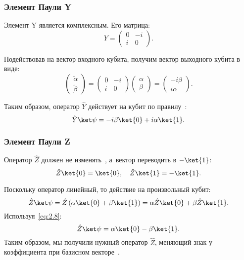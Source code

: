 \documentclass[pscyr,notitlepage]{hedwork}
\newcommand{\eq}[1]{\eqref{eq:#1}}
\renewcommand{\~}[1]{\widetilde{#1}}
\newcommand{\lb}{\left(}
\newcommand{\rb}{\right)}
\begin{document}
  \subsubsection{Элемент Паули Y}

  Элемент Y является комплексным. Его матрица:
  \[
    Y =
    \begin{pmatrix}
      0 & -i \\ i & 0
    \end{pmatrix}.
  \]
  
  Подействовав на вектор входного кубита, получим вектор выходного кубита в
  виде:
  \[
    \begin{pmatrix}
      \~\alpha \\ \~\beta
    \end{pmatrix} =
    \begin{pmatrix}
      0 & -i \\ i & 0
    \end{pmatrix}
    \begin{pmatrix}
      \alpha \\ \beta
    \end{pmatrix} =
    \begin{pmatrix}
      -i\beta \\ i\alpha
    \end{pmatrix}.
  \]
  
  Таким образом, оператор \( \hat{Y} \) действует на кубит по
  правилу~\cite{main}:
  \[
    \hat{Y}\ket\psi = -i\beta\ket{0} + i\alpha\ket{1}.
  \]

  \subsubsection{Элемент Паули Z}
  
  Оператор \( \hat{Z} \) должен не изменять~, а~вектор 
  переводить в \( -\ket{1} \):
  \begin{equation}
    \hat{Z}\ket{0} = \ket{0}, \quad
      \hat{Z}\ket{1} = -\ket{1}.
    \label{eq:2.8}
  \end{equation}
  
  Поскольку оператор линейный, то действие на произвольный кубит:
  \[
    \hat{Z}\ket\psi = \hat{Z}\lb\alpha\ket{0} + \beta\ket{1}\rb =
      \alpha\hat{Z}\ket{0} + \beta\hat{Z}\ket{1}.
  \]
  Используя~\eq{2.8}:
  \[
    \hat{Z}\ket\psi = \alpha\ket{0} - \beta\ket{1}.
  \]
  Таким образом, мы получили нужный оператор \( \hat{Z} \), меняющий знак
  у коэффициента при базисном векторе~.
  
\end{document}
